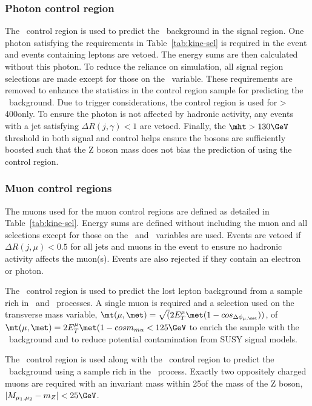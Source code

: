\subsubsection{Photon control region}
The \gj~control region is used to predict the \znunu~background in the signal region.
One photon satisfying the requirements in Table~\ref{tab:kine-sel} is required in the 
event and events containing leptons are vetoed. The energy sums are then calculated without this photon. 
To reduce the reliance on simulation, all signal region selections are made except for 
those on the \bdphi~variable. These requirements are removed to enhance 
the statistics in the control region sample 
for predicting the \znunu~background. Due to trigger considerations, the \gj control region
is used for \scalht > 400\GeV only. To ensure the photon is not affected by hadronic
activity, any events with a jet satisfying $\Delta R(j,\gamma) < 1$ are vetoed. Finally,
the $\mht > 130 \GeV$ threshold in both signal and control helps ensure the bosons are 
sufficiently boosted such that the Z boson mass does not bias the 
prediction of \znunu using the \gj control region.

\subsubsection{Muon control regions}
The muons used for the muon control regions are defined as detailed in
Table~\ref{tab:kine-sel}. Energy sums are defined without including the muon 
and all selections except for those on the \bdphi~and \alphat~variables are used.
Events are vetoed if $\Delta R(j,\mu) < 0.5$ for all jets and muons in the event to
ensure no hadronic activity affects the muon(s). Events are also rejected if they 
contain an electron or photon.

The \mj~control region is used to predict the lost lepton background from 
a sample rich in \wj~and \ttbar~processes. A single muon is required and a selection used on the transverse mass variable,
$\mt(\mu,\met) = \sqrt(2E^{\mu}_{T}\met(1-cos_{\Delta\phi_{\mu,\met}}))$,
of $\mt(\mu,\met) = 2E^{\mu}_{T}\met(1-cosm_{mu} < 125\GeV$ to enrich the sample with the \wj~background 
and to reduce potential contamination from SUSY signal models.

The \mmj~control region is used along with the \gj~control region to predict the \znunu~background
using a sample rich in the \zmmj~process. Exactly two oppositely charged muons are required with
an invariant mass within 25\GeV of the mass of the Z boson, $|M_{\mu_1,\mu_2} - m_Z| < 25\GeV$.

